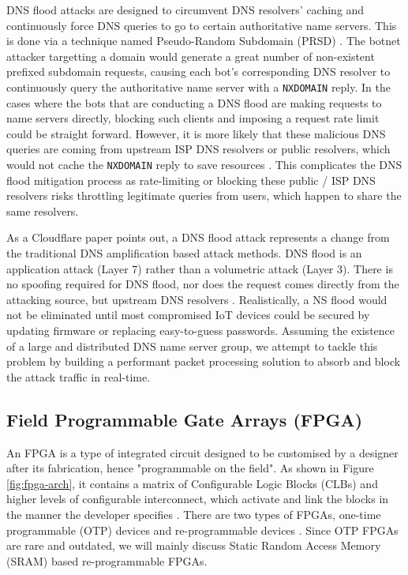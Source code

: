 \documentclass[a4paper]{report}
\newcommand{\code}{\texttt}
\begin{document}
DNS flood attacks are designed to circumvent DNS resolvers' caching and continuously force DNS queries to go to certain authoritative name servers. This is done via a technique named Pseudo-Random Subdomain (PRSD) \cite{akamai-dns-flood}. The botnet attacker targetting a domain would generate a great number of non-existent prefixed subdomain requests, causing each bot's corresponding DNS resolver to continuously query the authoritative name server with a \code{NXDOMAIN} reply. In the cases where the bots that are conducting a DNS flood are making requests to name servers directly, blocking such clients and imposing a request rate limit could be straight forward. However, it is more likely that these malicious DNS queries are coming from upstream ISP DNS resolvers or public resolvers, which would not cache the \code{NXDOMAIN} reply to save resources \cite{akamai-dns-flood}. This complicates the DNS flood mitigation process as rate-limiting or blocking these public / ISP DNS resolvers risks throttling legitimate queries from users, which happen to share the same resolvers.

As a Cloudflare paper \cite{cloudflare-dns-flood} points out, a DNS flood attack represents a change from the traditional DNS amplification based attack methods. DNS flood is an application attack (Layer 7) rather than a volumetric attack (Layer 3). There is no spoofing required for DNS flood, nor does the request comes directly from the attacking source, but upstream DNS resolvers \cite{akamai-dns-flood, cloudflare-dns-flood}. Realistically, a NS flood would not be eliminated until most compromised IoT devices could be secured by updating firmware or replacing easy-to-guess passwords. Assuming the existence of a large and distributed DNS name server group, we attempt to tackle this problem by building a performant packet processing solution to absorb and block the attack traffic in real-time.

\subsection{Field Programmable Gate Arrays (FPGA)}
\label{section:background-fpga}

An FPGA is a type of integrated circuit designed to be customised by a designer after its fabrication, hence "programmable on the field". As shown in Figure \ref{fig:fpga-arch}, it contains a matrix of Configurable Logic Blocks (CLBs) and higher levels of configurable interconnect, which activate and link the blocks in the manner the developer specifies \cite{xilinx-fpga}. There are two types of FPGAs, one-time programmable (OTP) devices and re-programmable devices \cite{xilinx-fpga}. Since OTP FPGAs are rare and outdated, we will mainly discuss Static Random Access Memory (SRAM) based re-programmable FPGAs.
\end{document}
